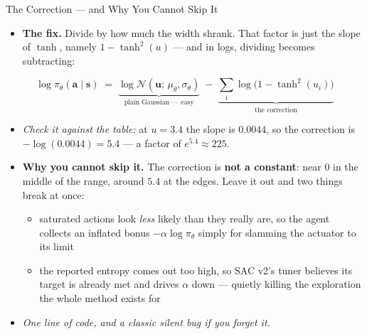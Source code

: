 \begin{frame}{The Correction --- and Why You Cannot Skip It}
\small
\begin{itemize}
    \item \textbf{The fix.} Divide by how much the width shrank. That factor is just the slope of $\tanh$, namely $1-\tanh^2(u)$ --- and in logs, dividing becomes subtracting:
\end{itemize}
\vspace{-0.2em}
\[
\log \pi_\theta(\mathbf{a}\mid\mathbf{s}) \;=\; \underbrace{\log \mathcal{N}(\mathbf{u};\,\mu_\theta,\sigma_\theta)}_{\text{plain Gaussian --- easy}} \;-\; \underbrace{\textstyle\sum_i \log\!\big(1 - \tanh^2(u_i)\big)}_{\text{the correction}}
\]
\vspace{-0.2em}
\begin{itemize}
    \item[] {\footnotesize \emph{Check it against the table:} at $u=3.4$ the slope is $0.0044$, so the correction is $-\log(0.0044)=5.4$ --- a factor of $e^{5.4}\approx 225$.}
    \vspace{0.6em}
    \item \textbf{Why you cannot skip it.} The correction is \textbf{not a constant}: near $0$ in the middle of the range, around $5.4$ at the edges. Leave it out and two things break at once:
    \begin{itemize}
        \vspace{0.2em}
        \item saturated actions look \emph{less} likely than they really are, so the agent collects an inflated bonus $-\alpha\log\pi_\theta$ simply for slamming the actuator to its limit
        \vspace{0.2em}
        \item the reported entropy comes out too high, so SAC v2's tuner believes its target is already met and drives $\alpha$ down --- quietly killing the exploration the whole method exists for
    \end{itemize}
    \vspace{0.4em}
    \item[$\Rightarrow$] \emph{One line of code, and a classic silent bug if you forget it.}
\end{itemize}
\end{frame}

